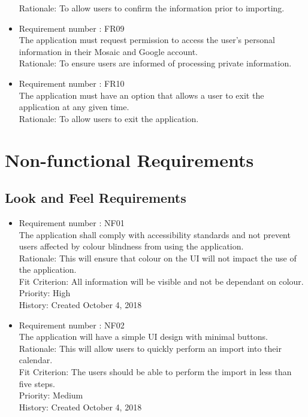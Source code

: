 \documentclass[12pt, titlepage]{article}
\begin{document}
\begin{itemize}
Rationale: To allow users to confirm the information prior to importing.
\item Requirement number : FR09\\
The application must request permission to access the user's personal information in their Mosaic and Google account. \\
Rationale: To ensure users are informed of processing private information.
\item Requirement number : FR10\\
The application must have an option that allows a user to exit the application at any given time.\\
Rationale: To  allow users to exit the application.

\end{itemize}

\section{Non-functional Requirements}

\subsection{Look and Feel Requirements}
\begin{itemize}
\item Requirement number : NF01\\
The application shall comply with accessibility standards and not prevent users affected by colour blindness from using the application.\\
Rationale: This will ensure that colour on the UI will not impact the use of the application.\\
Fit Criterion: All information will be visible and not be dependant on colour.\\
Priority: High\\
History: Created October 4, 2018

\item Requirement number : NF02 \\
The application will have a simple UI design with minimal buttons.\\
Rationale: This will allow users to quickly perform an import into their calendar.\\
Fit Criterion: The users should be able to perform the import in less than five steps.\\
Priority: Medium\\
History: Created October 4, 2018

\end{itemize}
\end{document}
